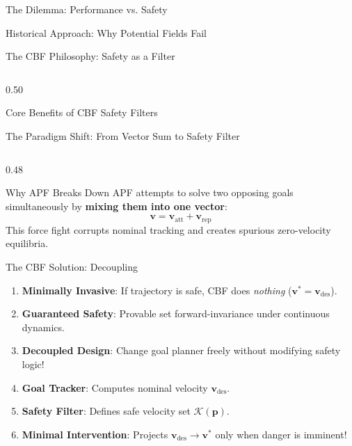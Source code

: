 \documentclass[aspectratio=169,10pt]{beamer}
\begin{document}
\begin{frame}{The Dilemma: Performance vs. Safety}
\begin{frame}{Historical Approach: Why Potential Fields Fail}
\begin{frame}{The CBF Philosophy: Safety as a Filter}
    \begin{column}{0.50\textwidth}
      \begin{exampleblock}{Core Benefits of CBF Safety Filters}
\begin{frame}{The Paradigm Shift: From Vector Sum to Safety Filter}
  \begin{columns}[T]
    \begin{column}{0.48\textwidth}
      \begin{block}{Why APF Breaks Down}
        \small
        APF attempts to solve two opposing goals simultaneously by \textbf{mixing them into one vector}:
        $$\mathbf{v} = \mathbf{v}_{\mathrm{att}} + \mathbf{v}_{\mathrm{rep}}$$
        This force fight corrupts nominal tracking and creates spurious zero-velocity equilibria.
      \end{block}

      \vspace{0.1em}
      \begin{exampleblock}{The CBF Solution: Decoupling}
        \scriptsize
        \begin{enumerate}
          \item \textbf{Minimally Invasive}: If trajectory is safe, CBF does \textit{nothing} ($\mathbf{v}^* = \mathbf{v}_{\mathrm{des}}$).
          \item \textbf{Guaranteed Safety}: Provable set forward-invariance under continuous dynamics.
          \item \textbf{Decoupled Design}: Change goal planner freely without modifying safety logic!
          \item \textbf{Goal Tracker}: Computes nominal velocity $\mathbf{v}_{\mathrm{des}}$.
          \item \textbf{Safety Filter}: Defines safe velocity set $\mathcal{K}(\mathbf{p})$.
          \item \textbf{Minimal Intervention}: Projects $\mathbf{v}_{\mathrm{des}} \to \mathbf{v}^*$ only when danger is imminent!
        \end{enumerate}
      \end{exampleblock}
    \end{column}


\end{columns}
\end{frame}
\end{exampleblock}
\end{column}
\end{frame}
\end{frame}
\end{frame}
\end{document}
